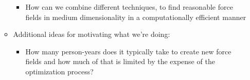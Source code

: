 \documentclass[aps,pre,nofootinbib,superscriptaddress,linenumbers,10pt, draft,tightenlines]{revtex4-1}
\begin{document}
\begin{itemize}
\begin{itemize}
\begin{itemize}
            \item How can we combine different techniques, to find reasonable force fields 
                  in medium dimensionality in a computationally efficient manner
        \end{itemize}
        \item Additional ideas for motivating what we're doing:
        \begin{itemize}
            \item How many person-years does it typically take to create new force fields and
                  how much of that is limited by the expense of the optimization process?
        \end{itemize}
    \end{itemize}
\end{itemize}
\end{document}
